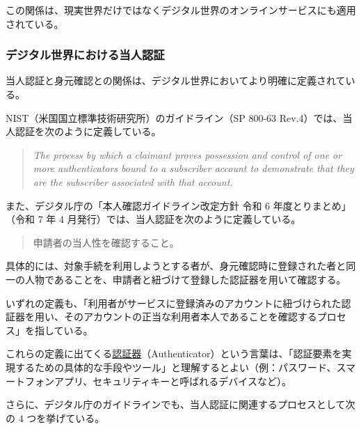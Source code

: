 \documentclass[uplatex]{jsarticle}
\def\label#1{}%
\begin{document}
この関係は、現実世界だけではなくデジタル世界のオンラインサービスにも適用されている。

\subsubsection{デジタル世界における当人認証}

当人認証と身元確認との関係は、デジタル世界においてより明確に定義されている。

\begin{rem}\label{rem:ch2-nist-authn}
NIST（米国国立標準技術研究所）のガイドライン（SP 800-63 Rev.4）では、当人認証を次のように定義している。
\begin{quote}
\textit{The process by which a claimant proves possession and control of one or more authenticators bound to a subscriber account to demonstrate that they are the subscriber associated with that account.}
\end{quote}
\end{rem}

\begin{rem}[デジタル庁のガイドラインにおける当人認証]\label{rem:ch2-digital-agency-authn}
また、デジタル庁の「本人確認ガイドライン改定方針 令和 6 年度とりまとめ」（令和 7 年 4 月発行）では、当人認証を次のように定義している。
\begin{quote}
申請者の当人性を確認すること。
\end{quote}
具体的には、対象手続を利用しようとする者が、身元確認時に登録された者と同一の人物であることを、申請者と紐づけて登録した認証器を用いて確認する。
\end{rem}

いずれの定義も、「利用者がサービスに登録済みのアカウントに紐づけられた認証器を用い、そのアカウントの正当な利用者本人であることを確認するプロセス」を指している。

\begin{dfn}[認証器]\label{dfn:ch2-authenticator}
これらの定義に出てくる\underline{認証器}（Authenticator）という言葉は、「認証要素を実現するための具体的な手段やツール」と理解するとよい（例：パスワード、スマートフォンアプリ、セキュリティキーと呼ばれるデバイスなど）。
\end{dfn}

さらに、デジタル庁のガイドラインでも、当人認証に関連するプロセスとして次の 4 つを挙げている。
\end{document}

